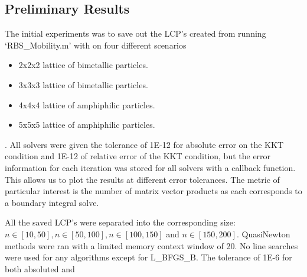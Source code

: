 \documentclass{article}
\newcommand{\x}{\mathbf{x}}
\renewcommand{\b}{\mathbf{b}}
\newcommand{\A}{\mathbf{A}}
\begin{document}
\subsection*{Preliminary Results}
The initial experiments was to save out the LCP's created from running `RBS\_Mobility.m' with on four different scenarios 
\begin{itemize}
    \item 2x2x2 lattice of bimetallic particles.
    \item 3x3x3 lattice of bimetallic particles.
    \item 4x4x4 lattice of amphiphilic particles.
    \item 5x5x5 lattice of amphiphilic particles.
\end{itemize}. 
All solvers were given the tolerance of 1E-12 for absolute error on the KKT condition and 1E-12 of relative error of the KKT condition, but the error information for each iteration was stored for all solvers with a callback function. This allows us to plot the results at different error tolerances. The metric of particular interest is the number of matrix vector products as each corresponds to a boundary integral solve. 

All the saved LCP's were separated into the corresponding size: $n \in [10,50], n\in [50,100], n \in [100,150]$ and $n \in [150,200]$. QuasiNewton methods were ran with a limited memory context window of 20. No line searches were used for any algorithms except for L\_BFGS\_B. The tolerance of 1E-6 for both absoluted and 


%     
\end{document}

